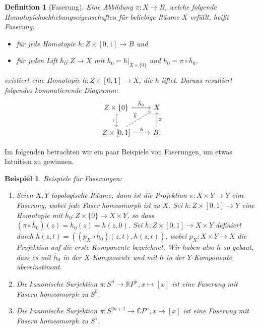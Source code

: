 \documentclass[12pt, hidelinks]{article}
\numberwithin{conj}{section}
\newtheorem{definition}[conj]{Definition}
\newtheorem{example}[conj]{Beispiel}
\begin{document}
\begin{definition}[Faserung]
Eine Abbildung $\pi: X \to B$, welche folgende Homotopiehochhebungseigenschaften für beliebige Räume $X$ erfüllt, heißt Faserung:
\begin{itemize}[noitemsep]
    \item für jede Homotopie $h: Z \times [0,1] \to B$ und
    \item für jeden Lift $\overline{h}_0: Z \to X$ mit $h_0 = h\vert_{X\times \{0\}}$ und $h_0 = \pi \circ \overline{h}_0$,
\end{itemize}
existiert eine Homotopie $\overline{h}: Z \times [0,1] \to X$, die $h$ liftet. Daraus resultiert folgendes kommutierende Diagramm:
\[\begin{tikzcd}
    {Z \times \{0\}} & X \\
    {Z\times[0,1]} & B.
    \arrow["{\overline{h}_0}", from=1-1, to=1-2]
    \arrow["\iota"', hook, from=1-1, to=2-1]
    \arrow["{\overline{h}}", dashed, from=2-1, to=1-2]
    \arrow["h", from=2-1, to=2-2]
    \arrow["\pi"', from=2-2, to=1-2]
\end{tikzcd}\]
\end{definition}
Im folgenden betrachten wir ein paar Beispiele von Faserungen, um etwas Intuition zu gewinnen.
\begin{example} Beispiele für Faserungen:
\label{examplesFibrations}
\begin{enumerate}[nolistsep]
    \item Seien $X,Y$ topologische Räume, dann ist die Projektion $\pi: X \times Y \to Y$ eine Faserung, wobei jede Faser homeomorph ist zu $X$. Sei $h: Z \times [0,1] \to Y$ eine Homotopie mit $\overline{h}_0: Z \times \{0\} \to X \times Y$, so dass $(\pi \circ \overline{h}_0)(z) = h_0(z) = h(z,0)$. Sei $\overline{h}: Z \times [0,1] \to X \times Y$ definiert durch $\overline{h}(z,t) = ((p_X \circ \overline{h}_0)(z,t), h(z,t))$, wobei $p_X: X \times Y \to X$ die Projektion auf die erste Komponente bezeichnet. Wir haben also $\overline{h}$ so gebaut, dass es mit $\overline{h}_0$ in der $X$-Komponente und mit $h$ in der $Y$-Komponente übereinstimmt.
    \item Die kanonische Surjektion $\pi: S^n \to \mathbb{R}P^n, x \mapsto [x]$ ist eine Faserung mit Fasern homeomorph zu $S^0$.
    \item Die kanonische Surjektion $\pi: S^{2n+1} \to \mathbb{C}P^n, x \mapsto [x]$ ist eine Faserung mit Fasern homeomorph zu $S^1$.
\end{enumerate}
\end{example}
\end{document}
